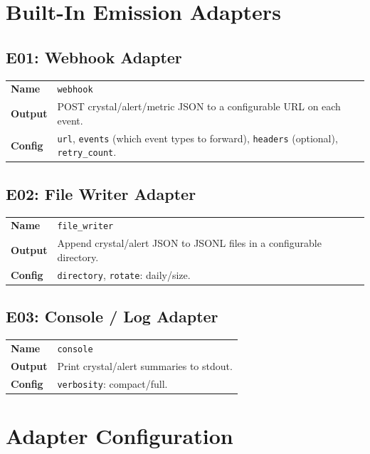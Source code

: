 \documentclass[11pt,a4paper,twoside]{article}
\theoremstyle{definition}
\theoremstyle{plain}
\theoremstyle{remark}
\begin{document}
\section{Built-In Emission Adapters}\label{sec:ad:emission}

\subsection{E01: Webhook Adapter}

\begin{tabularx}{\textwidth}{l X}
\toprule
\textbf{Name} & \texttt{webhook} \\
\textbf{Output} & POST crystal/alert/metric JSON to a configurable
  URL on each event. \\
\textbf{Config} & \texttt{url}, \texttt{events} (which event types to
  forward), \texttt{headers} (optional), \texttt{retry\_count}. \\
\bottomrule
\end{tabularx}

\subsection{E02: File Writer Adapter}

\begin{tabularx}{\textwidth}{l X}
\toprule
\textbf{Name} & \texttt{file\_writer} \\
\textbf{Output} & Append crystal/alert JSON to JSONL files in a
  configurable directory. \\
\textbf{Config} & \texttt{directory}, \texttt{rotate}: daily/size. \\
\bottomrule
\end{tabularx}

\subsection{E03: Console / Log Adapter}

\begin{tabularx}{\textwidth}{l X}
\toprule
\textbf{Name} & \texttt{console} \\
\textbf{Output} & Print crystal/alert summaries to stdout. \\
\textbf{Config} & \texttt{verbosity}: compact/full. \\
\bottomrule
\end{tabularx}


\section{Adapter Configuration}\label{sec:ad:config}
\end{document}
